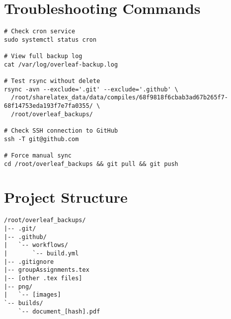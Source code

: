 \section{Troubleshooting Commands}

\begin{verbatim}
# Check cron service
sudo systemctl status cron

# View full backup log
cat /var/log/overleaf-backup.log

# Test rsync without delete
rsync -avn --exclude='.git' --exclude='.github' \
  /root/sharelatex_data/data/compiles/68f9818f6cbab3ad67b265f7-68f14753eda193f7e7fa0355/ \
  /root/overleaf_backups/

# Check SSH connection to GitHub
ssh -T git@github.com

# Force manual sync
cd /root/overleaf_backups && git pull && git push
\end{verbatim}

\section{Project Structure}

\begin{verbatim}
/root/overleaf_backups/
|-- .git/
|-- .github/
|   `-- workflows/
|       `-- build.yml
|-- .gitignore
|-- groupAssignments.tex
|-- [other .tex files]
|-- png/
|   `-- [images]
`-- builds/
    `-- document_[hash].pdf
\end{verbatim}